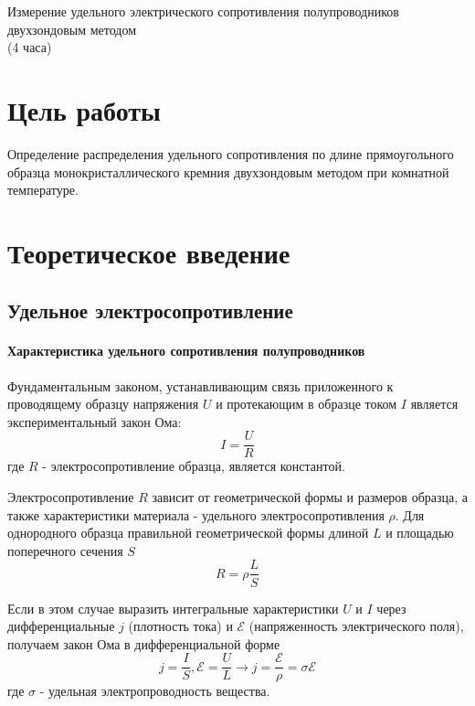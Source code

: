 \newpage

\setcounter{chapter}{1}
\setcounter{figure}{0}
\setcounter{table}{0}

\begin{center}
Измерение удельного электрического сопротивления полупроводников двухзондовым методом\\
(4 часа)
\end{center}

\section{Цель работы}
Определение распределения удельного сопротивления по длине прямоугольного образца монокристаллического кремния двухзондовым методом при комнатной температуре.

\section{Теоретическое введение}
\subsection{Удельное электросопротивление}
\paragraph{Характеристика удельного сопротивления полупроводников}

Фундаментальным законом, устанавливающим связь приложенного к проводящему образцу напряжения $U$ и протекающим в образце током $I$ является экспериментальный закон Ома:
\begin{equation}
I = \frac{U}{R}
\end{equation}
где $R$ - электросопротивление образца, является константой.

Электросопротивление $R$ зависит от геометрической формы и размеров образца, а также характеристики материала - удельного электросопротивления $\rho$. Для однородного образца правильной геометрической формы длиной $L$ и площадью поперечного сечения $S$
\begin{equation}
R = \rho \frac{L}{S}
\end{equation}

Если в этом случае выразить интегральные характеристики $U$ и $I$ через дифференциальные $j$ (плотность тока) и $\mathcal{E}$ (напряженность электрического поля), получаем закон Ома в дифференциальной форме
\begin{equation}
j = \frac{I}{S}, \mathcal{E} = \frac{U}{L} \rightarrow j = \frac{\mathcal{E}}{\rho} = \sigma \mathcal{E}
\end{equation}
где $\sigma$ - удельная электропроводность вещества.

